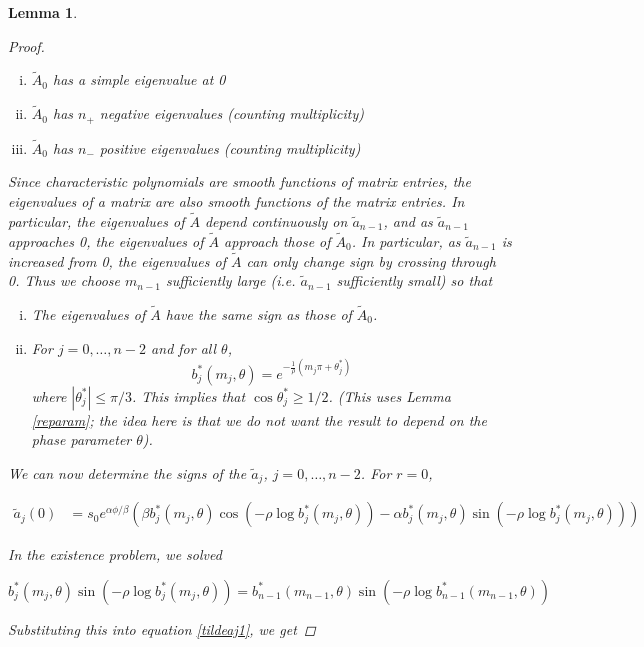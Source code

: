 \documentclass[12pt]{article}
\newtheorem{lemma}{Lemma}
\begin{document}
\begin{lemma}
\begin{proof}
\begin{enumerate}[(i)]
\item $\tilde{A}_0$ has a simple eigenvalue at 0
\item $\tilde{A}_0$ has $n_+$ negative eigenvalues (counting multiplicity)
\item $\tilde{A}_0$ has $n_-$ positive eigenvalues (counting multiplicity)
\end{enumerate}

Since characteristic polynomials are smooth functions of matrix entries, the eigenvalues of a matrix are also smooth functions of the matrix entries. In particular, the eigenvalues of $\tilde{A}$ depend continuously on $\tilde{a}_{n-1}$, and as $\tilde{a}_{n-1}$ approaches 0, the eigenvalues of $\tilde{A}$ approach those of $\tilde{A}_0$. In particular, as $\tilde{a}_{n-1}$ is increased from 0, the eigenvalues of $\tilde{A}$ can only change sign by crossing through 0. Thus we choose $m_{n-1}$ sufficiently large (i.e. $\tilde{a}_{n-1}$ sufficiently small) so that

\begin{enumerate}[(i)]
	\item The eigenvalues of $\tilde{A}$ have the same sign as those of $\tilde{A}_0$.
	\item For $j = 0, \dots, n-2$ and for all $\theta$,
	\[
	b^*_j(m_j, \theta) = e^{ -\frac{1}{\rho} ( m_j \pi + \theta^*_j ) }
	\]
	where $|\theta^*_j| \leq \pi/3$. This implies that $\cos \theta^*_j \geq 1/2$. (This uses Lemma \ref{reparam}; the idea here is that we do not want the result to depend on the phase parameter $\theta$).
\end{enumerate}

We can now determine the signs of the $\tilde{a}_j$, $j = 0, \dots, n-2$. For $r = 0$,

\begin{align}\label{tildeaj1}
\tilde{a}_j(0)
&= s_0 e^{\alpha \phi/\beta} \left( \beta b^*_j(m_j, \theta) \cos\left( -\rho \log b^*_j(m_j, \theta) \right) - \alpha b^*_j(m_j, \theta) \sin \left(  -\rho \log b^*_j(m_j, \theta) \right) \right) 
\end{align}

In the existence problem, we solved

\[
b^*_j(m_j, \theta) \sin \left( -\rho \log b^*_j(m_j, \theta) \right) = b^*_{n-1}(m_{n-1}, \theta) \sin \left( -\rho \log b^*_{n-1}(m_{n-1}, \theta) \right)
\]

Substituting this into equation \eqref{tildeaj1}, we get


\end{proof}
\end{lemma}
\end{document}
